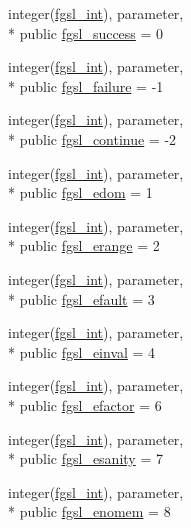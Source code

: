 \begin{DoxyCompactItemize}
integer(\hyperlink{classfgsl_a222deda1d7a0c0e845ce4a683318efeb}{fgsl\-\_\-int}), parameter, \\*
public \hyperlink{classfgsl_a5637d95a4aceec9a80a9b74a2e40ebdf}{fgsl\-\_\-success} = 0
\item 
integer(\hyperlink{classfgsl_a222deda1d7a0c0e845ce4a683318efeb}{fgsl\-\_\-int}), parameter, \\*
public \hyperlink{classfgsl_a4cb2b20fedfc04419dd412d3bdc635e0}{fgsl\-\_\-failure} = -\/1
\item 
integer(\hyperlink{classfgsl_a222deda1d7a0c0e845ce4a683318efeb}{fgsl\-\_\-int}), parameter, \\*
public \hyperlink{classfgsl_adaee86adbad23b6853659f6564d6c46b}{fgsl\-\_\-continue} = -\/2
\item 
integer(\hyperlink{classfgsl_a222deda1d7a0c0e845ce4a683318efeb}{fgsl\-\_\-int}), parameter, \\*
public \hyperlink{classfgsl_a4a331f3c353a431cb6975bbe8e0cbf63}{fgsl\-\_\-edom} = 1
\item 
integer(\hyperlink{classfgsl_a222deda1d7a0c0e845ce4a683318efeb}{fgsl\-\_\-int}), parameter, \\*
public \hyperlink{classfgsl_a25790738744df3ed3e0b2d50d9b30976}{fgsl\-\_\-erange} = 2
\item 
integer(\hyperlink{classfgsl_a222deda1d7a0c0e845ce4a683318efeb}{fgsl\-\_\-int}), parameter, \\*
public \hyperlink{classfgsl_a3866fec8a527d4830fa9b88464c52417}{fgsl\-\_\-efault} = 3
\item 
integer(\hyperlink{classfgsl_a222deda1d7a0c0e845ce4a683318efeb}{fgsl\-\_\-int}), parameter, \\*
public \hyperlink{classfgsl_a720540845b1b10b1af117475a2b5f2c7}{fgsl\-\_\-einval} = 4
\item 
integer(\hyperlink{classfgsl_a222deda1d7a0c0e845ce4a683318efeb}{fgsl\-\_\-int}), parameter, \\*
public \hyperlink{classfgsl_a027973d6b14562a967273973aed85e4f}{fgsl\-\_\-efactor} = 6
\item 
integer(\hyperlink{classfgsl_a222deda1d7a0c0e845ce4a683318efeb}{fgsl\-\_\-int}), parameter, \\*
public \hyperlink{classfgsl_a9dc60d8f0ce30b7b328d703d09a0e987}{fgsl\-\_\-esanity} = 7
\item 
integer(\hyperlink{classfgsl_a222deda1d7a0c0e845ce4a683318efeb}{fgsl\-\_\-int}), parameter, \\*
public \hyperlink{classfgsl_a70b026317b5a6f797b14978468ca01d9}{fgsl\-\_\-enomem} = 8

\end{DoxyCompactItemize}
